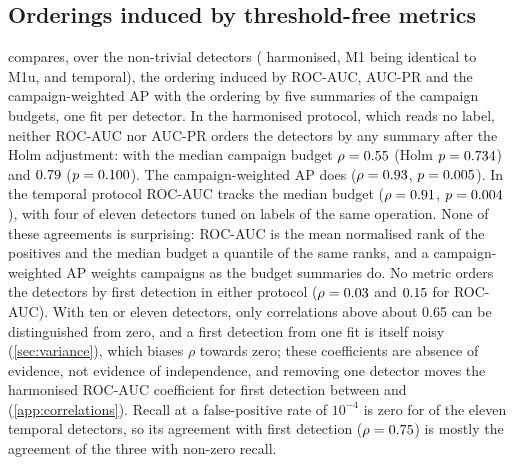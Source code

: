\documentclass[11pt,a4paper]{article}
\begin{document}
\subsection{Orderings induced by threshold-free metrics}
\label{sec:orderings}
 compares, over the non-trivial detectors (\HarmNonTrivial{} harmonised, M1 being identical to M1u, and \TempNonTrivial{} temporal), the ordering induced by ROC-AUC, AUC-PR and the campaign-weighted AP with the ordering by five summaries of the campaign budgets, one fit per detector. In the harmonised protocol, which reads no label, neither ROC-AUC nor AUC-PR orders the detectors by any summary after the Holm adjustment: with the median campaign budget $\rho = 0.55$ (Holm $p = 0.734$) and $0.79$ ($p = 0.100$). The campaign-weighted AP does ($\rho = 0.93$, $p = 0.005$). In the temporal protocol ROC-AUC tracks the median budget ($\rho = 0.91$, $p = 0.004$), with four of eleven detectors tuned on labels of the same operation. None of these agreements is surprising: ROC-AUC is the mean normalised rank of the positives and the median budget a quantile of the same ranks, and a campaign-weighted AP weights campaigns as the budget summaries do. No metric orders the detectors by first detection in either protocol ($\rho = 0.03$ and $0.15$ for ROC-AUC). With ten or eleven detectors, only correlations above about 0.65 can be distinguished from zero, and a first detection from one fit is itself noisy (\cref{sec:variance}), which biases $\rho$ towards zero; these coefficients are absence of evidence, not evidence of independence, and removing one detector moves the harmonised ROC-AUC coefficient for first detection between \HarmRhoRocAucFirstLow{} and \HarmRhoRocAucFirstHigh{} (\cref{app:correlations}). Recall at a false-positive rate of $10^{-4}$ is zero for \TempRecallFprZeros{} of the eleven temporal detectors, so its agreement with first detection ($\rho = 0.75$) is mostly the agreement of the three with non-zero recall.
\end{document}
